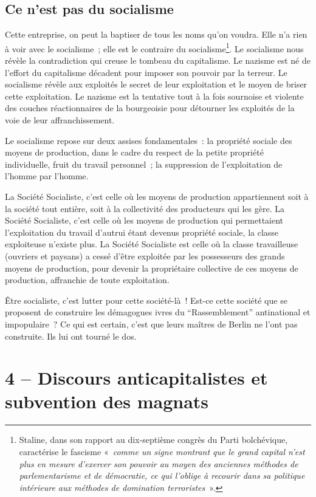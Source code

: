 \documentclass[french,twoside]{book} %
\newcommand\chapteropen{} %
\newcommand\chapterclose{} %
\begin{document}
\section[Ce n’est pas du socialisme]{Ce n’est pas du socialisme}
\noindent Cette entreprise, on peut la baptiser de tous les noms qu’on voudra. Elle n’a rien à voir avec le socialisme ; elle est le contraire du socialisme\footnote{Staline, dans son rapport au dix-septième congrès du Parti bolchévique, caractérise le fascisme « \emph{comme un signe montrant que le grand capital n’est plus en mesure d’exercer son pouvoir au moyen des anciennes méthodes de parlementarisme et de démocratie, ce qui l’oblige à recourir dans sa politique intérieure aux méthodes de domination terroristes} ».}. Le socialisme nous révèle la contradiction qui creuse le tombeau du capitalisme. Le nazisme est né de l’effort du capitalisme décadent pour imposer son pouvoir par la terreur. Le socialisme révèle aux exploités le secret de leur exploitation et le moyen de briser cette exploitation. Le nazisme est la tentative tout à la fois sournoise et violente des couches réactionnaires de la bourgeoisie pour détourner les exploités de la voie de leur affranchissement.\par
Le socialisme repose sur deux assises fondamentales : la propriété sociale des moyens de production, dans le cadre du respect de la petite propriété individuelle, fruit du travail personnel ; la suppression de l’exploitation de l’homme par l’homme.\par
La Société Socialiste, c’est celle où les moyens de production appartiennent soit à la société tout entière, soit à la collectivité des producteurs qui les gère. La Société Socialiste, c’est celle où les moyens de production qui permettaient l’exploitation du travail d’autrui étant devenus propriété sociale, la classe exploiteuse n’existe plus. La Société Socialiste est celle où la classe travailleuse (ouvriers et paysans) a cessé d’être exploitée par les possesseurs des grands moyens de production, pour devenir la propriétaire collective de ces moyens de production, affranchie de toute exploitation.\par
Être socialiste, c’est lutter pour cette société-là ! Est-ce cette société que se proposent de construire les démagogues ivres du “Rassemblement” antinational et impopulaire ? Ce qui est certain, c’est que leurs maîtres de Berlin ne l’ont pas construite. Ils lui ont tourné le dos.
\chapterclose


\chapteropen
\chapter[4 – Discours anticapitalistes et subvention des magnats]{4 – Discours anticapitalistes et subvention des magnats}\renewcommand{\leftmark}{4 – Discours anticapitalistes et subvention des magnats}
\end{document}
